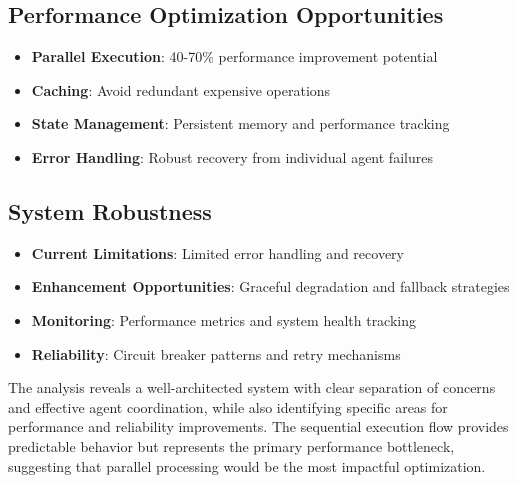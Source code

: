 \subsection{Performance Optimization Opportunities}
\begin{itemize}
\item \textbf{Parallel Execution}: 40-70\% performance improvement potential
\item \textbf{Caching}: Avoid redundant expensive operations
\item \textbf{State Management}: Persistent memory and performance tracking
\item \textbf{Error Handling}: Robust recovery from individual agent failures
\end{itemize}

\subsection{System Robustness}
\begin{itemize}
\item \textbf{Current Limitations}: Limited error handling and recovery
\item \textbf{Enhancement Opportunities}: Graceful degradation and fallback strategies
\item \textbf{Monitoring}: Performance metrics and system health tracking
\item \textbf{Reliability}: Circuit breaker patterns and retry mechanisms
\end{itemize}

The analysis reveals a well-architected system with clear separation of concerns and effective agent coordination, while also identifying specific areas for performance and reliability improvements. The sequential execution flow provides predictable behavior but represents the primary performance bottleneck, suggesting that parallel processing would be the most impactful optimization.